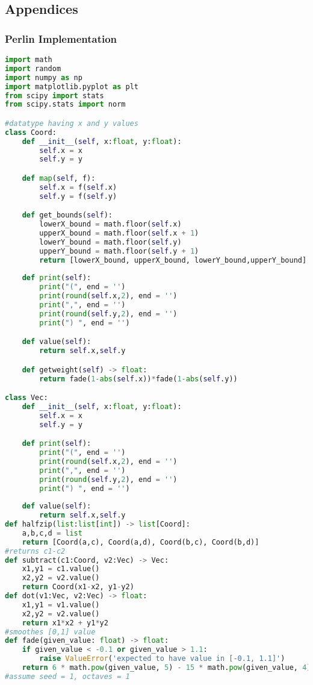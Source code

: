 \documentclass[11pt,a4paper]{article}
\begin{document}
\subsection{Appendices}
\subsubsection{Perlin Implementation}
\begin{lstlisting}[language=Python, mathescape=true]
import math
import random
import numpy as np
import matplotlib.pyplot as plt
from scipy import stats
from scipy.stats import norm

#datatype having x and y values
class Coord:
    def __init__(self, x:float, y:float):
        self.x = x
        self.y = y

    def map(self, f):
        self.x = f(self.x)
        self.y = f(self.y)

    def get_bounds(self):
        lowerX_bound = math.floor(self.x)
        upperX_bound = math.floor(self.x + 1)
        lowerY_bound = math.floor(self.y)
        upperY_bound = math.floor(self.y + 1)
        return [lowerX_bound, upperX_bound, lowerY_bound,upperY_bound]
    
    def print(self):
        print("(", end = '')
        print(round(self.x,2), end = '')
        print(",", end = '')
        print(round(self.y,2), end = '')
        print(") ", end = '')

    def value(self):
        return self.x,self.y

    def getweight(self) -> float:
        return fade(1-abs(self.x))*fade(1-abs(self.y))

class Vec:
    def __init__(self, x:float, y:float):
        self.x = x
        self.y = y

    def print(self):
        print("(", end = '')
        print(round(self.x,2), end = '')
        print(",", end = '')
        print(round(self.y,2), end = '')
        print(") ", end = '')
    
    def value(self):
        return self.x,self.y
def halfzip(list:list[int]) -> list[Coord]:
    a,b,c,d = list
    return [Coord(a,c), Coord(a,d), Coord(b,c), Coord(b,d)]
#returns c1-c2
def subtract(c1:Coord, v2:Vec) -> Vec:
    x1,y1 = c1.value()
    x2,y2 = v2.value()
    return Coord(x1-x2, y1-y2)
def dot(v1:Vec, v2:Vec) -> float:
    x1,y1 = v1.value()
    x2,y2 = v2.value()
    return x1*x2 + y1*y2
#smoothes [0,1] value
def fade(given_value: float) -> float:
    if given_value < -0.1 or given_value > 1.1: 
        raise ValueError('expected to have value in [-0.1, 1.1]')
    return 6 * math.pow(given_value, 5) - 15 * math.pow(given_value, 4) + 10 * math.pow(given_value, 3)
#assume seed = 1, octaves = 1


\end{lstlisting}
\end{document}
